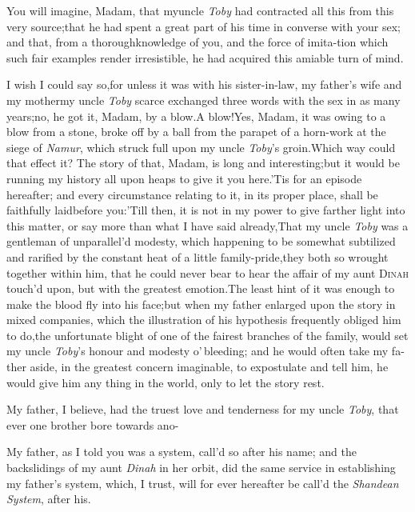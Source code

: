 \documentclass{article}
\begin{document}
You will imagine, Madam, that my\break uncle \textit{Toby} had
contracted all this from this very source;\tsk  that he had spent a great
part of his time in converse with your sex; and that, from a
thorough\break knowledge of you, and the force of imita-\pb tion which such
fair examples render irresistible, he had acquired this amiable
turn of mind.

I wish I could say so,\tsk  for unless it was with his
sister-in-law, my father’s wife and my mother\tsh  my
uncle \textit{Toby} scarce exchanged three words with the sex in as
many years;\tsh  no, he got it, Madam, by a
blow.\tsh  A blow!\tsk  Yes, Madam, it was owing to a
blow from a stone, broke off by a ball from the parapet of a
horn-work at the siege of \textit{Namur}, which struck full upon my uncle
\textit{Toby}’s groin.\tsk  Which way could that effect it?
The story of that, Madam, is long and interesting;\tsk  but it
would be running my history all upon heaps to give it you
here.\tsh  ’Tis for an episode hereafter; and every
circumstance relating to it, in its proper place, shall be
faithfully laid\pb before you:\tsk  ’Till then, it is not in my
power to give farther light into this matter, or say more than what I have said
already,\tsh  That my uncle \textit{Toby} was a gentleman of
unparallel’d modesty, which happening to be somewhat
subtilized and rarified by the constant heat of a little family-pride,\tsh  they
both so wrought together within him, that he could never bear to hear the affair of
my aunt \textsc{Dinah} touch’d upon, but with the greatest emotion.\tsh  The least
hint of it was enough to make the blood fly into his face;\tsk  but when my father
enlarged upon the story in mixed companies, which the illustration of his hypothesis
frequently obliged him to do,\tsk  the unfortunate blight of one of the fairest
branches of the family, would set my uncle \textit{Toby}’s honour and modesty
o’\,bleed\-ing; and he would often take my fa-\pb ther aside, in the greatest concern
imaginable, to expostulate and tell him, he would give him any thing in the world,
only to let the story rest.

My father, I believe, had the truest love and tenderness for my uncle \textit{Toby},
that ever one brother bore towards ano-\break
{}

\tsk My father, as I told you was a\break 
{}
\pb system, call’d so
after his name; and the backslidings of my aunt \textit{Dinah} in her orbit, did
the same service in establishing my father’s system, which, I trust, will
for ever hereafter be call’d the \textit{Shandean System}, after his.
\end{document}
